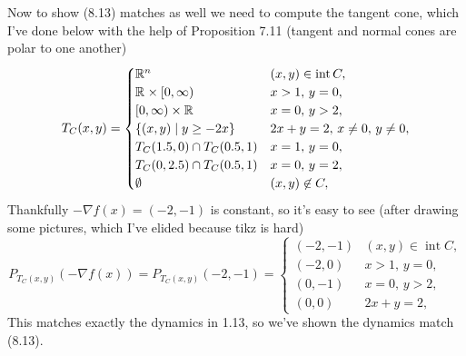 \documentclass{article}
\newenvironment{ex}[1]
  {\renewcommand\theexercise{#1}\exercise}
  {\endexercise}
\DeclareMathOperator*{\inte}{int}
\newcommand{\R}[1]{\mathbb{R}^{#1}}
\begin{document}
\begin{ex}{8.12}
  Now to show (8.13) matches as well we need to compute the tangent cone, which I've done below with the help of Proposition 7.11 (tangent and normal cones are polar to one another)
  $$
  T_C(x, y) = \begin{cases}
    \R{n} & (x, y) \in\inte C, \\
    \R{} \times [0, \infty) & x > 1,  \, y = 0, \\
    [0, \infty) \times \R{} & x = 0, \, y > 2, \\
    \braces{ (x, y) \mid y \ge -2x } & 2x + y = 2, \, x \ne 0, \, y \ne 0, \\
    T_C(1.5, 0) \cap T_C(0.5, 1) & x = 1, \, y = 0, \\
    T_C(0, 2.5) \cap T_C(0.5, 1) & x = 0, \, y = 2, \\
    \emptyset & (x, y) \not\in C,
  \end{cases}
  $$
  Thankfully $-\nabla f(x) = (-2, -1)$ is constant, so it's easy to see (after drawing some pictures, which I've elided because tikz is hard)
  $$
  P_{T_C(x, y)}(-\nabla f(x)) = P_{T_C(x, y)}(-2, -1) = \begin{cases}
    (-2, -1) & (x, y) \in \inte C, \\
    (-2, 0) & x > 1, \, y = 0, \\
    (0, -1) & x = 0, \, y  > 2, \\
    (0, 0) & 2x + y = 2,
  \end{cases}
  $$
  This matches exactly the dynamics in 1.13, so we've shown the dynamics match (8.13).
\end{ex} %
\end{document}
